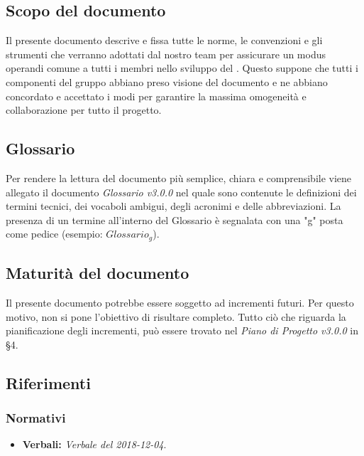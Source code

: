 \subsection{Scopo del documento}
Il presente documento descrive e fissa tutte le norme, le convenzioni e gli strumenti che verranno adottati dal nostro team per assicurare un modus operandi comune a tutti i membri nello sviluppo del . Questo suppone che tutti i componenti del gruppo abbiano preso visione del documento e ne abbiano concordato e accettato i modi per garantire la massima omogeneità e collaborazione per tutto il progetto.
\subsection{Glossario}
Per rendere la lettura del documento più semplice, chiara e comprensibile viene allegato il documento \emph{Glossario v3.0.0} nel quale sono contenute le definizioni dei termini tecnici, dei vocaboli ambigui, degli acronimi e delle abbreviazioni. La presenza di un termine all'interno del Glossario è segnalata con una "g" posta come pedice (esempio: $Glossario_{g}$).
\subsection{Maturità del documento}
Il presente documento potrebbe essere soggetto ad incrementi futuri. Per questo motivo, non si pone l'obiettivo di risultare completo.
Tutto ciò che riguarda la pianificazione degli incrementi, può essere trovato nel \emph{Piano di Progetto v3.0.0} in §4.
\subsection{Riferimenti}
\subsubsection{Normativi}
\begin{itemize}
	\item \textbf{Verbali:} \emph{Verbale del 2018-12-04}.
\end{itemize}
